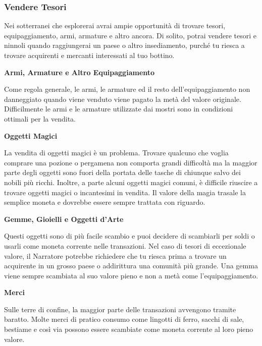 \begin{multicols}{2}

\subsubsection{Vendere Tesori}

Nei sotterranei che esplorerai avrai ampie opportunità di trovare tesori, equipaggiamento, armi, armature e altro ancora. Di solito, potrai vendere tesori e ninnoli quando raggiungerai un paese o altro insediamento, purché tu riesca a trovare acquirenti e mercanti interessati al tuo bottino.

\medskip

\textbf{Armi, Armature e Altro Equipaggiamento }

Come regola generale, le armi, le armature ed il resto dell'equipaggiamento non danneggiato quando viene venduto viene pagato la metà del valore originale. Difficilmente le armi e le armature utilizzate dai mostri sono in condizioni ottimali per la vendita.

\medskip

\textbf{Oggetti Magici}

La vendita di oggetti magici è un problema. Trovare qualcuno che voglia comprare una pozione o pergamena non comporta grandi difficoltà ma la maggior parte degli oggetti sono fuori della portata delle tasche di chiunque salvo dei nobili più ricchi. Inoltre, a parte alcuni oggetti magici comuni, è difficile riuscire a trovare oggetti magici o incantesimi in vendita. Il valore della magia trasale la semplice moneta e dovrebbe essere sempre trattata con riguardo.

\medskip

\textbf{Gemme, Gioielli e Oggetti d'Arte}

Questi oggetti sono di più facile scambio e puoi decidere di scambiarli per soldi o usarli come moneta corrente nelle transazioni. Nel caso di tesori di eccezionale valore, il Narratore potrebbe richiedere che tu riesca prima a trovare un acquirente in un grosso paese o addirittura una comunità più grande. Una gemma viene sempre scambiata al suo valore pieno e non a metà come l'equipaggiamento.

\medskip

\textbf{Merci}

Sulle terre di confine, la maggior parte delle transazioni avvengono tramite baratto. Molte merci di pratico consumo come lingotti di ferro, sacchi di sale, bestiame e così via possono essere scambiate come moneta corrente al loro pieno valore.


\end{multicols}
